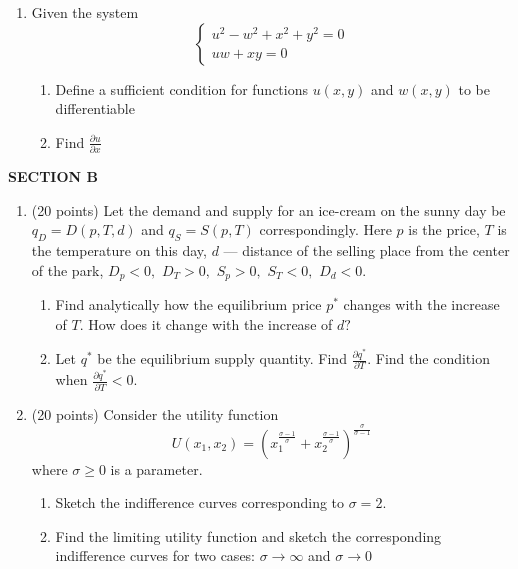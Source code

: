 \documentclass[12pt]{article} %
\theoremstyle{definition} %
\begin{document}
\begin{enumerate}
\item Given the system
\begin{equation} \nonumber
\begin{cases}
u^2-w^2+x^2+y^2=0 \\
uw+xy=0
\end{cases}
\end{equation}
\begin{enumerate}
\item Define a sufficient condition for functions $u(x,y)$ and $w(x,y)$ to be differentiable
\item Find $\frac{\partial u}{\partial x}$
\end{enumerate}

\end{enumerate}

\textbf{SECTION B}

\begin{enumerate}[resume]
\item (20 points) Let the demand and supply for an ice-cream on the sunny day be $q_D=D(p, T, d)$ and $q_S=S(p,T)$ correspondingly. Here $p$ is the price, $T$ is the temperature on this day, $d$ --- distance of the selling place from the center of the park, $D_p<0,$ $D_T>0,$ $S_p>0,$ $S_T<0,$ $D_d<0.$

\begin{enumerate}
\item Find analytically how the equilibrium price $p^{\ast}$ changes with the increase of $T.$ How does it change with the increase of $d?$
\item Let $q^{\ast}$ be the equilibrium supply quantity. Find $\frac{\partial{q^{\ast}}}{\partial T}.$ Find the condition when $\frac{\partial{q^{\ast}}}{\partial T}<0.$
\end{enumerate}

\item (20 points) Consider the utility function
$$
U(x_1, x_2) = \left(x_1^\frac{\sigma-1}{\sigma}+x_2^\frac{\sigma-1}{\sigma}\right)^\frac{\sigma}{\sigma-1}
$$
where $\sigma \geq 0$ is a parameter.

\begin{enumerate}
\item Sketch the indifference curves corresponding to $\sigma=2$.
\item Find the limiting utility function and sketch the corresponding indifference curves for two cases: $\sigma \rightarrow \infty$ and $\sigma \rightarrow 0$
\end{enumerate}
\end{enumerate}
\end{document}
